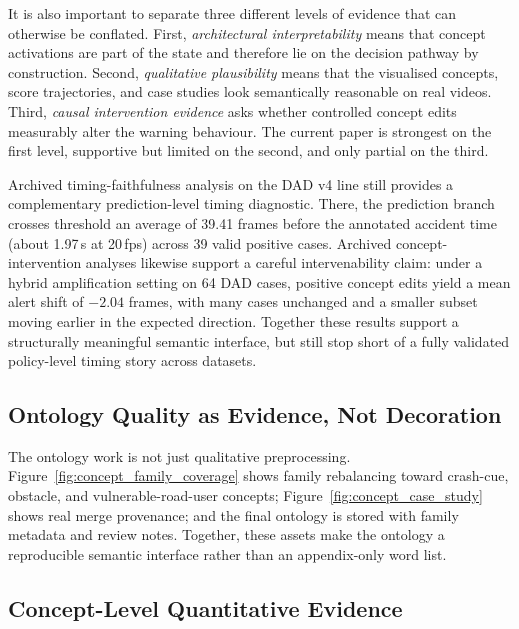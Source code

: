 It is also important to separate three different levels of evidence that can
otherwise be conflated. First, \emph{architectural interpretability} means that
concept activations are part of the state and therefore lie on the decision
pathway by construction. Second, \emph{qualitative plausibility} means that the
visualised concepts, score trajectories, and case studies look semantically
reasonable on real videos. Third, \emph{causal intervention evidence} asks
whether controlled concept edits measurably alter the warning behaviour. The
current paper is strongest on the first level, supportive but limited on the
second, and only partial on the third.

Archived timing-faithfulness analysis on the DAD v4 line still provides a
complementary prediction-level timing diagnostic. There, the prediction branch
crosses threshold an average of 39.41 frames before the annotated accident time
(about 1.97\,s at 20\,fps) across 39 valid positive cases. Archived
concept-intervention analyses likewise support a careful intervenability claim:
under a hybrid amplification setting on 64 DAD cases, positive concept edits
yield a mean alert shift of $-2.04$ frames, with many cases unchanged and a
smaller subset moving earlier in the expected direction. Together these results
support a structurally meaningful semantic interface, but still stop short of a
fully validated policy-level timing story across datasets.

\subsection{Ontology Quality as Evidence, Not Decoration}

The ontology work is not just qualitative preprocessing. Figure~\ref{fig:concept_family_coverage}
shows family rebalancing toward crash-cue, obstacle, and vulnerable-road-user
concepts; Figure~\ref{fig:concept_case_study} shows real merge provenance; and
the final ontology is stored with family metadata and review notes. Together,
these assets make the ontology a reproducible semantic interface rather than an
appendix-only word list.

\subsection{Concept-Level Quantitative Evidence}

